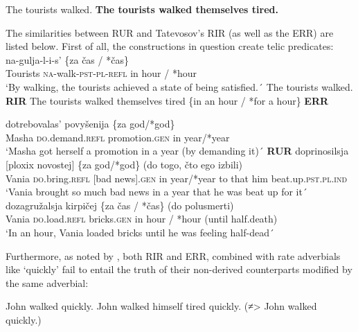 \documentclass[output=paper,colorlinks,citecolor=brown]{./langscibook}
\begin{document}
\ea%
    \label{ex:antonyuk:36}
    \ea \label{ex:antonyuk:36a}
    The tourists walked.
    \ex \label{ex:antonyuk:36b}
    \textbf{The tourists walked themselves tired.} 
    \z
\z

The similarities between RUR and Tatevosov’s RIR (as well as the ERR) are listed below. First of all, the constructions in question create telic predicates:\\

\ea%
    \label{ex:antonyuk:37}
    \ea \label{ex:antonyuk:37a}
     {na-gulja-l-i-s’}                 {\{za} {čas} {/} {*čas\}}\\
    Tourists      \textsc{na-}walk\textsc{-pst-pl-refl} in hour / *hour\\
    \glt `By walking, the tourists achieved a state of being satisfied.´ The tourists walked. \hfill \textbf{RIR}
    \ex \label{ex:antonyuk:37b}
    The tourists walked themselves tired \{in an hour / *for a hour\} \hfill \textbf{ERR}
    \z
\z

\ea%
    \label{ex:antonyuk:38}
    \ea \label{ex:antonyuk:38a}
       {dotrebovalas’}          {povyšenija}        {\{za} {god/*god\}}\\
    Masha \textsc{do}.demand.\textsc{refl} promotion.\textsc{gen} in year/*year\\
    \glt `Masha got herself  a promotion in a year (by demanding it)´ \hfill \textbf{RUR}
    \ex \label{ex:antonyuk:38b}
     {doprinosilsja}      {[ploxix} {novostej]} {\{za} {god/*god}\} (do togo, čto {ego} {izbili)}\\
    Vania \textsc{do}.bring.\textsc{refl} [bad    news].\textsc{gen}  in year/*year to that {} him beat.up.\textsc{pst.pl.ind}\\
    \glt `Vania brought so much bad news in a year that he was beat up for it´
    \ex \label{ex:antonyuk:38c}
     {dozagružalsja}     {kirpičej}  {\{za} {čas} {/} *čas\} (do     polusmerti)\\
    Vania \textsc{do}.load.\textsc{refl} bricks.\textsc{gen} in hour / *hour (until half.death)\\
    \glt `In an hour, Vania loaded bricks until he was feeling half-dead´
    \z
\z

Furthermore, as noted by \citeauthor{Tatevosov2010}, both RIR and ERR, combined with rate adverbials like ‘quickly’ fail to entail the truth of their non-derived counterparts modified by the same adverbial:


\ea%
    \label{ex:antonyuk:39}
    \ea \label{ex:antonyuk:39a}
    John walked quickly.
    \ex \label{ex:antonyuk:39b}
    John walked himself tired quickly. (≠> John walked quickly.) 
    \z
\z
\end{document}
